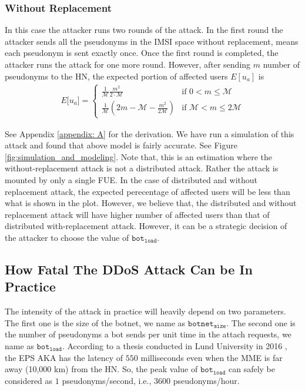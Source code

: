 \documentclass{llncs} %
\begin{document}
\subsubsection{Without Replacement}
In this case the attacker runs two rounds of the attack. In the first round the attacker sends all the pseudonyms in the IMSI space without replacement, means each pseudonym is sent exactly once. Once the first round is completed, the attacker runs the attack for one more round. However, after sending $m$ number of pseudonyms to the HN, the expected portion of affected users $E[u_a]$ is
\begin{eqnarray}
E\big[ u_a \big] = \begin{cases} \frac{1}{\mathcal{M}}\frac{m^2}{2\cdot \mathcal{M}} & \mbox{if } 0 < m \leq \mathcal{M} \\ 
\frac{1}{\mathcal{M}}(2m - \mathcal{M} - \frac{m^2}{2\mathcal{M}}) & \mbox{if } \mathcal{M} < m \leq 2\mathcal{M} \end{cases}
\label{eqn:without_replacement}
\end{eqnarray} 

See Appendix \ref{appendix: A} for the derivation. We have run a simulation of this attack and found that above model is fairly accurate. See Figure \ref{fig:simulation_and_modeling}. Note that, this is an estimation where the without-replacement attack is not a distributed attack. Rather the attack is mounted by only a single FUE. In the case of distributed and without replacement attack, the expected perecentage of affected users will be less than what is shown in the plot. However, we believe that, the distributed and without replacement attack will have higher number of affected users than that of distributed with-replacement attack. However, it can be a strategic decision of the attacker to choose the value of $\texttt{bot}_{\texttt{load}}$.


\subsection{How Fatal The DDoS Attack Can be In Practice} \label{sec:how_fatal_ddos}
The intensity of the attack in practice will heavily depend on two parameters. The first one is the size of the botnet, we name as $\texttt{botnet}_{\texttt{size}}$. The second one is the number of pseudonyms a bot sends per unit time in the attach requests, we name as $\texttt{bot}_{\texttt{load}}$. According to a thesis conducted in Lund University in 2016 \cite{thesislund}, the EPS AKA has the latency of $550$ milliseconds even when the MME is far away (10,000 km) from the HN. So, the peak value of $\texttt{bot}_{\texttt{load}}$ can safely be considered as $1$ pseudonyms/second, i.e., 3600 pseudonyms/hour.
\end{document}
